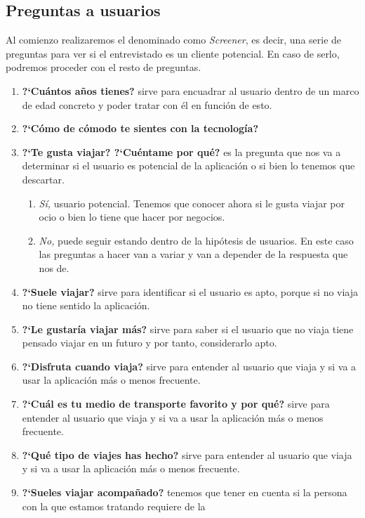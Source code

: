 \subsection{Preguntas a usuarios}

Al comienzo realizaremos el denominado como \textit{Screener}, es decir, una serie de preguntas para ver si el entrevistado es un cliente potencial. En caso de serlo,
podremos proceder con el resto de preguntas.

\begin{enumerate}
    \item {\textbf{?`Cuántos años tienes?}} sirve para encuadrar al usuario dentro de un marco de edad concreto y poder tratar con él en función de esto.
    \item {\textbf{?`Cómo de cómodo te sientes con la tecnología?}}
    \item {\textbf{?`Te gusta viajar? ?`Cuéntame por qué?}} es la pregunta que nos va a determinar si el usuario es potencial de la aplicación
                o si bien lo tenemos que descartar.
    \begin{enumerate}
        \item {\textit{Sí,}} usuario potencial. Tenemos que conocer ahora si le gusta viajar por ocio o bien lo tiene que hacer por negocios.
        \item {\textit{No,}} puede seguir estando dentro de la hipótesis de usuarios. En este caso las preguntas a hacer van a variar y van a
                        depender de la respuesta que nos de.
    \end{enumerate}
    \item {\textbf{?`Suele viajar?}} sirve para identificar si el usuario es apto, porque si no viaja no tiene sentido la aplicación.
    \item {\textbf{?`Le gustaría viajar más?}} sirve para saber si el usuario que no viaja tiene pensado viajar en un futuro y por tanto, considerarlo apto.
    \item {\textbf{?`Disfruta cuando viaja?}} sirve para entender al usuario que viaja y si va a usar la aplicación más o menos frecuente.
    \item {\textbf{?`Cuál es tu medio de transporte favorito y por qué?}} sirve para entender al usuario que viaja y si va a usar la aplicación más o menos frecuente.
    \item {\textbf{?`Qué tipo de viajes has hecho?}} sirve para entender al usuario que viaja y si va a usar la aplicación más o menos frecuente.
    \item {\textbf{?`Sueles viajar acompañado?}} tenemos que tener en cuenta si la persona con la que estamos tratando requiere de la

\end{enumerate}
